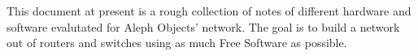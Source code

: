 %
%
%
%
%

This document at present is a rough collection of notes of different hardware
and software evalutated for Aleph Objects' network. The goal is to build a
network out of routers and switches using as much Free Software as possible.


